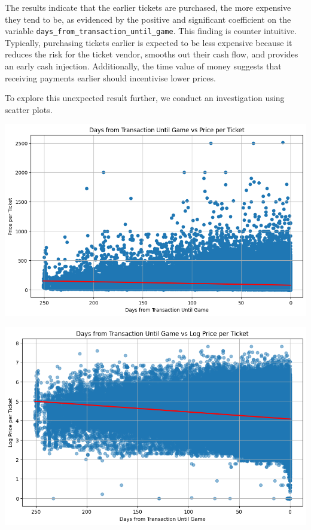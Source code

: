 \documentclass[
  12pt]{article}
\begin{document}
The results indicate that the earlier tickets are purchased, the more
expensive they tend to be, as evidenced by the positive and significant
coefficient on the variable
\texttt{days\_from\_transaction\_until\_game}. This finding is counter
intuitive. Typically, purchasing tickets earlier is expected to be less
expensive because it reduces the risk for the ticket vendor, smooths out
their cash flow, and provides an early cash injection. Additionally, the
time value of money suggests that receiving payments earlier should
incentivise lower prices.

To explore this unexpected result further, we conduct an investigation
using scatter plots.

\includegraphics{images/16.png}

\includegraphics{images/17.png}
\end{document}
